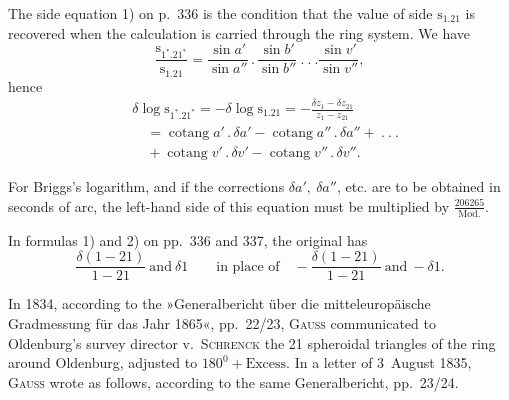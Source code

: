 \par\noindent\hspace*{\parindent}The side equation 1) on p.~336 is the condition that the value of side \(\mathrm{s}_{1.21}\) is recovered when the calculation is carried through the ring system. We have
\[
\frac{\mathrm{s}_{1^*.21^*}}{\mathrm{s}_{1.21}}=\frac{\sin a'}{\sin a''}\,.\,\frac{\sin b'}{\sin b''}\ .\ .\ .\frac{\sin v'}{\sin v''},
\]
\noindent hence
\[
\begin{aligned}
&\delta\log\mathrm{s}_{1^*.21^*}=-\delta\log\mathrm{s}_{1.21}=-\frac{\delta z_1-\delta z_{21}}{z_1-z_{21}}\\
&\quad=\operatorname{cotang}a'\,.\,\delta a'-\operatorname{cotang}a''\,.\,\delta a''+\ .\ .\ .\\
&\quad+\operatorname{cotang}v'\,.\,\delta v'-\operatorname{cotang}v''\,.\,\delta v''.
\end{aligned}
\]
\par\noindent\hspace*{\parindent}For Briggs's logarithm, and if the corrections \(\delta a',\ \delta a''\), etc. are to be obtained in seconds of arc, the left-hand side of this equation must be multiplied by \(\frac{206265}{\mathrm{Mod.}}\).

\par\noindent\hspace*{\parindent}In formulas 1) and 2) on pp.~336 and 337, the original has
\[
\frac{\delta(1-21)}{1-21}\ \text{and}\ \delta1\qquad\text{in place of}\quad-\frac{\delta(1-21)}{1-21}\ \text{and}\ -\delta1.
\]
\par\noindent\hspace*{\parindent}In 1834, according to the »Generalbericht über die mitteleuropäische Gradmessung für das Jahr 1865«, pp.~22/23, \textsc{Gauss} communicated to Oldenburg's survey director v.~\textsc{Schrenck} the 21 spheroidal triangles of the ring around Oldenburg, adjusted to \(180^0+\text{Excess}\). In a letter of 3~August 1835, \textsc{Gauss} wrote as follows, according to the same Generalbericht, pp.~23/24.

